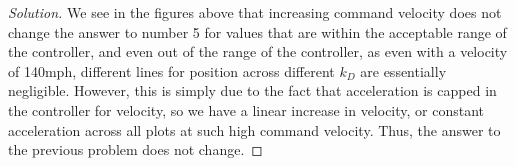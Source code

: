 \documentclass{article}
\begin{document}
\begin{proof}[Solution]
We see in the figures above that increasing command velocity does not change the answer to number 5 for values that are 
within the acceptable range of the controller, and even out of the range of the controller, as even with a velocity of 140mph, different lines for position across different $k_D$ are essentially negligible. However, this is simply due to the fact that acceleration is capped in the controller for velocity, so we have a linear increase in velocity, or constant acceleration across all plots at such high command velocity.
Thus, the answer to the previous problem does not change.
\end{proof}
\end{document}
